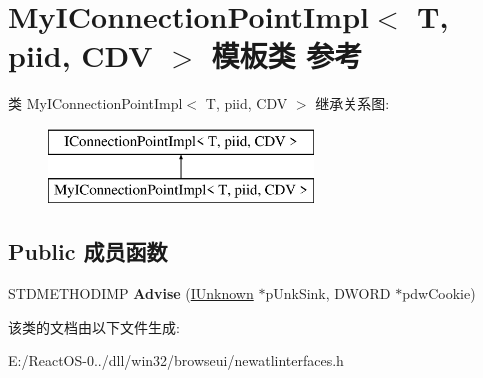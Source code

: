 \hypertarget{class_my_i_connection_point_impl}{}\section{My\+I\+Connection\+Point\+Impl$<$ T, piid, C\+DV $>$ 模板类 参考}
\label{class_my_i_connection_point_impl}
类 My\+I\+Connection\+Point\+Impl$<$ T, piid, C\+DV $>$ 继承关系图\+:\begin{figure}[H]
\begin{center}
\leavevmode
\includegraphics[height=2.000000cm]{class_my_i_connection_point_impl}
\end{center}
\end{figure}
\subsection*{Public 成员函数}
\begin{DoxyCompactItemize}
\item 
\mbox{\label{class_my_i_connection_point_impl_a7abe26795e4d787c0d0f74112815da5a}} 
S\+T\+D\+M\+E\+T\+H\+O\+D\+I\+MP {\bfseries Advise} (\hyperlink{interface_i_unknown}{I\+Unknown} $\ast$p\+Unk\+Sink, D\+W\+O\+RD $\ast$pdw\+Cookie)
\end{DoxyCompactItemize}


该类的文档由以下文件生成\+:\begin{DoxyCompactItemize}
\item 
E\+:/\+React\+O\+S-\/0../dll/win32/browseui/newatlinterfaces.\+h\end{DoxyCompactItemize}
